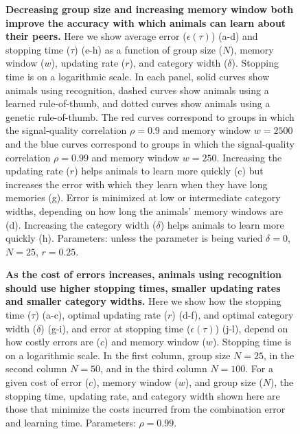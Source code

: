 \begin{figure}
\caption{\sffamily\small\textbf{Decreasing group size and increasing memory window both improve the accuracy with which animals can learn about their peers.} Here we show average error ($\epsilon(\tau)$) (a-d) and stopping time ($\tau$) (e-h) as a function of group size ($N$), memory window ($w$), updating rate ($r$), and category width ($\delta$). Stopping time is on a logarithmic scale. In each panel, solid curves show animals using recognition, dashed curves show animals using a learned rule-of-thumb, and dotted curves show animals using a genetic rule-of-thumb. The red curves correspond to groups in which the signal-quality correlation $\rho=0.9$ and memory window $w=2500$ and the blue curves correspond to groups in which the signal-quality correlation $\rho=0.99$ and memory window $w=250$. Increasing the updating rate ($r$) helps animals to learn more quickly (c) but increases the error with which they learn when they have long memories (g). Error is minimized at low or intermediate category widths, depending on how long the animals' memory windows are (d). Increasing the category width ($\delta$) helps animals to learn more quickly (h). Parameters: unless the parameter is being varied $\delta = 0$, $N=25$, $r=0.25$.}
\label{parameters}
\end{figure}

\begin{figure}
\caption{\sffamily\small\textbf{As the cost of errors increases, animals using recognition should use higher stopping times, smaller updating rates and smaller category widths.} Here we show how the stopping time ($\tau$) (a-c),  optimal updating rate ($r$) (d-f), and optimal category width ($\delta$) (g-i), and error at stopping time ($\epsilon(\tau)$) (j-l), depend on how costly errors are ($c$) and memory window ($w$). Stopping time is on a logarithmic scale. In the first column, group size $N=25$, in the second column $N=50$, and in the third column $N=100$. For a given cost of error ($c$), memory window ($w$), and group size ($N$), the stopping time, updating rate, and category width shown here are those that minimize the costs incurred from the combination error and learning time. Parameters: $\rho=0.99$. }
\label{optimization}
\end{figure}


